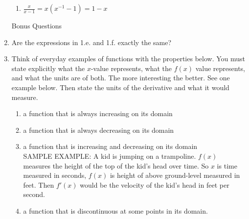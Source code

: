 \documentclass[11pt,fleqn]{article}
\begin{document}
\begin{enumerate}
\begin{enumerate}
	\item $\frac{x}{x-1}=x(x^{-1}-1)=1-x$\\ \vfill
	\end{enumerate}
\newpage
Bonus Questions
\item Are the expressions in  1.e. and 1.f. exactly the same?
\vfill
\item Think of everyday examples of functions with the properties below. You must state explicitly what the $x$-value represents, what the $f(x)$ value represents, and what the units are of both. The more interesting the better. See one example below. Then state the units of the derivative and what it would measure.
	\begin{enumerate}
	\item a function that is always increasing on its domain
	\vfill
	\item a function that is always decreasing on its domain
	\vfill
	\item a function that is increasing and decreasing on its domain\\
	
	SAMPLE EXAMPLE: A kid is jumping on a trampoline. $f(x)$ measures the height of the top of the kid's head over time. So $x$ is time measured in seconds, $f(x)$ is height of above ground-level measured in feet. Then $f'(x)$ would be the velocity of the kid's head in feet per second.
	\vfill
	\item a function that is discontinuous at some points in its domain.
	\vfill
	\end{enumerate}
\end{enumerate}
\end{document}
